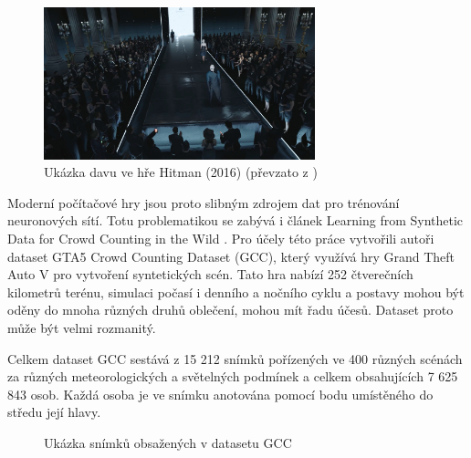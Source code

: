 \begin{figure}[h!]
	\centering
	\includegraphics[width=0.7\textwidth]{Figures/datasets/GCC/Hitman_crowd.png}
	\caption{Ukázka davu ve hře Hitman (2016) (převzato z \cite{ign_2017})}
	\label{fig:RNN_architecture}
\end{figure}


Moderní počítačové hry jsou proto slibným zdrojem dat pro trénování neuronových sítí.
Totu problematikou se zabývá i článek Learning from Synthetic Data for Crowd Counting in the Wild \cite{GCC_dataset}. 
Pro účely této práce vytvořili autoři dataset GTA5 Crowd Counting Dataset (GCC), který využívá hry Grand Theft Auto V \cite{GTAV} pro vytvoření syntetických scén.
Tato hra nabízí 252 čtverečních kilometrů terénu, simulaci počasí i denního a nočního cyklu a postavy mohou být oděny do mnoha různých druhů oblečení, mohou mít řadu účesů.
Dataset proto může být velmi rozmanitý.

Celkem dataset GCC sestává z 15 212 snímků pořízených ve 400 různých scénách za různých meteorologických a světelných podmínek a celkem obsahujících 7 625 843 osob.
Každá osoba je ve snímku anotována pomocí bodu umístěného do středu její hlavy.

\begin{figure}[h!]
	\centering
	\caption{Ukázka snímků obsažených v datasetu GCC \cite{GCC_dataset}}
	\label{fig:QNRF}
\end{figure}

